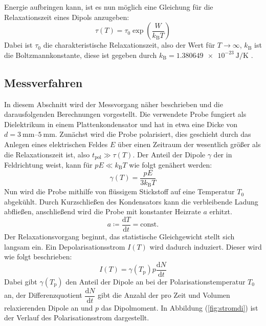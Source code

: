 Energie aufbringen kann, ist es nun möglich eine Gleichung für die Relaxationszeit eines Dipols anzugeben:
\begin{equation}
  \label{eqn:relax}
  \tau(T)=\tau_\mathrm{0}\exp\left(\dfrac{W}{k_\mathrm{B}T}\right)
\end{equation}
Dabei ist $\tau_\mathrm{0}$ die charakteristische Relaxationszeit, also der Wert für $T\rightarrow\infty$, $k_\mathrm{B}$ ist die Boltzmannkonstante, diese ist gegeben durch $k_\mathrm{B}=\SI{1.380649e-23}{\joule\per\kelvin}$ \cite{Anleitung7}.
\subsection{Messverfahren}
\label{sec:messv}
In diesem Abschnitt wird der Messvorgang näher beschrieben und die darausfolgenden Berechnungen vorgestellt. Die verwendete Probe fungiert als Dielektrikum in einem Plattenkondensator und hat in etwa eine Dicke von $d=\SIrange{3}{5}{\milli\meter}$. Zunächst wird die Probe polarisiert, dies geschieht durch das Anlegen eines elektrischen Feldes $E$ über einen Zeitraum der wesentlich größer als die Relaxationszeit ist, also $t_\mathrm{pol}\gg\tau(T)$.
Der Anteil der Dipole $\gamma$ der in Feldrichtung weist, kann für $pE\ll k_\mathrm{B}T$ wie folgt genähert werden:
\begin{equation}
  \label{eqn:anteil}
  \gamma(T)=\dfrac{pE}{3k_\mathrm{B}T}
\end{equation}
Nun wird die Probe mithilfe von flüssigem Stickstoff auf eine Temperatur $T_\mathrm{0}$ abgekühlt. Durch Kurzschließen des Kondensators kann die verbleibende Ladung abfließen,
anschließend wird die Probe mit konstanter Heizrate $a$ erhitzt.
\begin{equation}
  a\coloneqq\dfrac{\mathrm{d} T}{\mathrm{d} t}= \mathrm{const.}
\end{equation}
Der Relaxationsvorgang beginnt, das statistische Gleichgewicht stellt sich langsam ein. Ein Depolarisationsstrom $I(T)$ wird dadurch induziert.
Dieser wird wie folgt beschrieben:
\begin{equation}
  \label{eqn:stromdichte}
  I(T)=\gamma(T_\mathrm{p})p\dfrac{\mathrm{d} N}{\mathrm{d} t}
\end{equation}
Dabei gibt $\gamma(T_\mathrm{p})$ den Anteil der Dipole an bei der Polarisationstemperatur $T_\mathrm{0}$ an, der Differenzquotient $\dfrac{\mathrm{d} N}{\mathrm{d} t}$ gibt die Anzahl der pro Zeit und Volumen relaxierenden Dipole an und
$p$ das Dipolmoment. In Abbildung (\ref{fig:stromdi}) ist der Verlauf des Polarisationsstrom dargestellt.
